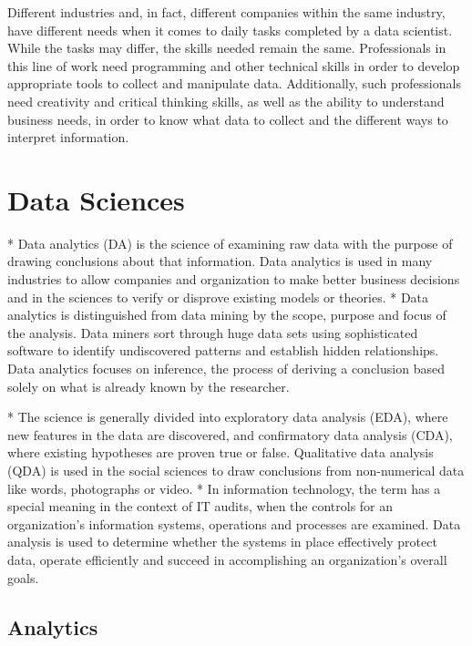 \begin{description}
Different industries and, in fact, different companies within the same industry, have different needs when it comes to daily tasks completed by a data scientist. While the tasks may differ, the skills needed remain the same. Professionals in this line of work need programming and other technical skills in order to develop appropriate tools to collect and manipulate data. Additionally, such professionals need creativity and critical thinking skills, as well as the ability to understand business needs, in order to know what data to collect and the different ways to interpret information.

  \medskip

\section*{Data Sciences}

*  Data analytics (DA) is the science of examining raw data with the purpose of drawing conclusions about that information. Data analytics is used in many industries to allow companies and organization to make better business decisions and in the sciences to verify or disprove existing models or theories. 
*  Data analytics is distinguished from data mining by the scope, purpose and focus of the analysis. Data miners sort through huge data sets using sophisticated software to identify undiscovered patterns and establish hidden relationships. Data analytics focuses on inference, the process of deriving a conclusion based solely on what is already known by the researcher.

*  The science is generally divided into exploratory data analysis (EDA), where new features in the data are discovered, and confirmatory data analysis (CDA), where existing hypotheses are proven true or false. Qualitative data analysis (QDA) is used in the social sciences to draw conclusions from non-numerical data like words, photographs or video. 
*  In information technology, the term has a special meaning in the context of IT audits, when the controls for an organization's information systems, operations and processes are examined. Data analysis is used to determine whether the systems in place effectively protect data, operate efficiently and succeed in accomplishing an organization's overall goals.

    \subsection*{ Analytics }


\end{description}
